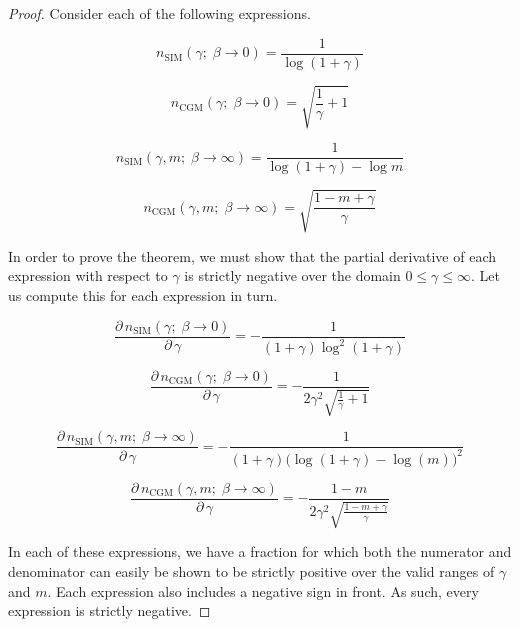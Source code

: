 \begin{proof}
    Consider each of the following expressions.

    \begin{equation*}
        n_{\text{SIM}}(\gamma ; \; \beta \rightarrow 0) =  \frac{1}{\log(1 + \gamma)}
     \end{equation*}

     \begin{equation*}
        n_{\text{CGM}}(\gamma ; \; \beta \rightarrow 0) = \sqrt{\frac{1}{\gamma} + 1}
     \end{equation*}

    \begin{equation*}
        n_{\text{SIM}}(\gamma, m; \; \beta \rightarrow \infty) =  \frac{1}{\log(1 + \gamma) - \log m}
    \end{equation*}

    \begin{equation*}
        n_{\text{CGM}}(\gamma, m; \; \beta \rightarrow \infty) = \sqrt{\frac{1 - m + \gamma}{\gamma}}
    \end{equation*}

In order to prove the theorem, we must show that the partial derivative of each expression with respect to $\gamma$ is strictly negative over the domain $0 \leq \gamma \leq \infty$. Let us compute this for each expression in turn. 

\begin{equation*}
    \frac{\partial \,  n_{\text{SIM}}(\gamma ; \; \beta \rightarrow 0)}{\partial \, \gamma} = - \frac{1}{(1 + \gamma)\log^2(1 + \gamma)}
\end{equation*}

\begin{equation*}
    \frac{\partial \,  n_{\text{CGM}}(\gamma ; \; \beta \rightarrow 0)}{\partial \, \gamma}  = - \frac{1}{2 \gamma^2 \sqrt{\frac{1}{\gamma} + 1}}
\end{equation*}

\begin{equation*}
    \frac{\partial \,  n_{\text{SIM}}(\gamma, m ; \; \beta \rightarrow \infty)}{\partial \, \gamma}  =  - \frac{1}{(1 + \gamma)\big(\log(1 + \gamma) - \log(m) \big)^2}
\end{equation*}

\begin{equation*}
    \frac{\partial \,  n_{\text{CGM}}(\gamma, m ; \; \beta \rightarrow \infty)}{\partial \, \gamma}  = - \frac{1 - m}{2 \gamma^2 \sqrt{\frac{1 - m + \gamma}{\gamma}}}
\end{equation*}

In each of these expressions, we have a fraction for which both the numerator and denominator can easily be shown to be strictly positive over the valid ranges of $\gamma$ and $m$. Each expression also includes a negative sign in front. As such, every expression is strictly negative. 

\end{proof}

